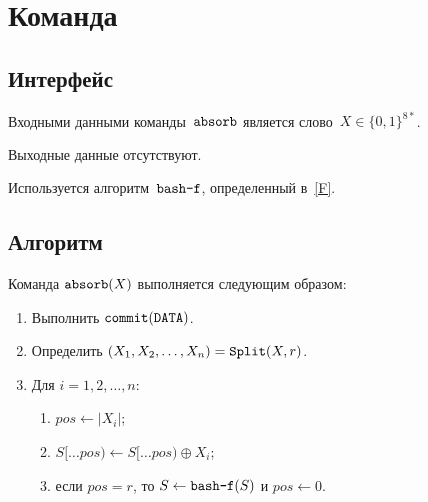 \section{Команда }\label{PRG.Absorb}

\subsection{Интерфейс}\label{PRG.Absorb.IFace}

Входными данными команды~$\texttt{absorb}$ является слово~$X\in\{0,1\}^{8*}$.

Выходные данные отсутствуют.

Используется алгоритм~$\texttt{bash-f}$, определенный в~\ref{F}.

\subsection{Алгоритм}\label{PRG.Absorb.Alg}

Команда $\texttt{absorb}(X)$ выполняется следующим образом:
\begin{enumerate}
\item
Выполнить 
$\texttt{commit}(\texttt{DATA})$.
\item
Определить $(X_1,X_2,\ldots,X_n)=\mathop{\texttt{Split}}\nolimits(X,r)$.
\item
Для $i=1,2,\ldots,n$:
\begin{enumerate}
\item
$pos\leftarrow |X_i|$;
\item
$S[\dots pos)\leftarrow S[\dots pos)\oplus X_i$;
\item
если $pos=r$, то 
$S\leftarrow\texttt{bash-f}(S)$ и $pos\leftarrow 0$.
\end{enumerate}
\end{enumerate}

